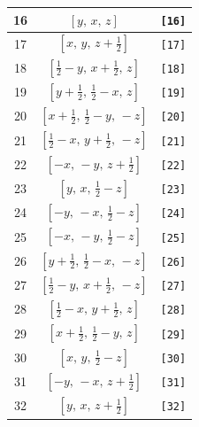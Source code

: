 \documentclass[fleqn,8pt]{jsarticle}
\begin{document}
\begin{longtable}{ccc}
16 & $\left[ y,\, x,\, z \right]$ & {\tt [16]} \\ \hline
17 & $\left[ x,\, y,\, z + \frac{1}{2} \right]$ & {\tt [17]} \\ \hline
18 & $\left[ \frac{1}{2} - y,\, x + \frac{1}{2},\, z \right]$ & {\tt [18]} \\ \hline
19 & $\left[ y + \frac{1}{2},\, \frac{1}{2} - x,\, z \right]$ & {\tt [19]} \\ \hline
20 & $\left[ x + \frac{1}{2},\, \frac{1}{2} - y,\, - z \right]$ & {\tt [20]} \\ \hline
21 & $\left[ \frac{1}{2} - x,\, y + \frac{1}{2},\, - z \right]$ & {\tt [21]} \\ \hline
22 & $\left[ - x,\, - y,\, z + \frac{1}{2} \right]$ & {\tt [22]} \\ \hline
23 & $\left[ y,\, x,\, \frac{1}{2} - z \right]$ & {\tt [23]} \\ \hline
24 & $\left[ - y,\, - x,\, \frac{1}{2} - z \right]$ & {\tt [24]} \\ \hline
25 & $\left[ - x,\, - y,\, \frac{1}{2} - z \right]$ & {\tt [25]} \\ \hline
26 & $\left[ y + \frac{1}{2},\, \frac{1}{2} - x,\, - z \right]$ & {\tt [26]} \\ \hline
27 & $\left[ \frac{1}{2} - y,\, x + \frac{1}{2},\, - z \right]$ & {\tt [27]} \\ \hline
28 & $\left[ \frac{1}{2} - x,\, y + \frac{1}{2},\, z \right]$ & {\tt [28]} \\ \hline
29 & $\left[ x + \frac{1}{2},\, \frac{1}{2} - y,\, z \right]$ & {\tt [29]} \\ \hline
30 & $\left[ x,\, y,\, \frac{1}{2} - z \right]$ & {\tt [30]} \\ \hline
31 & $\left[ - y,\, - x,\, z + \frac{1}{2} \right]$ & {\tt [31]} \\ \hline
32 & $\left[ y,\, x,\, z + \frac{1}{2} \right]$ & {\tt [32]} \\
\end{longtable}
\end{document}
